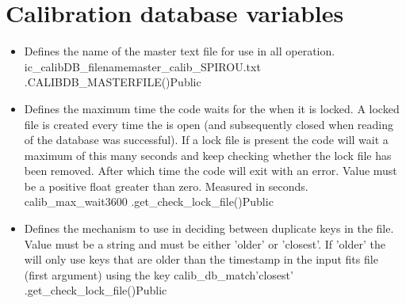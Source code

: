\section{Calibration database variables}
\label{ch:variables:calibdb}

\begin{itemize}

\item {} 
{Defines the name of the master \calibdb text file for use in all \calibdb operation.}
{ic\_calibDB\_filename}{master\_calib{\hskip 0pt}\_SPIROU.txt}
{\AllRecipes}{\constantsfile}{\spirouConst.CALIBDB\_MASTERFILE()}{Public}


\item {}
{Defines the maximum time the code waits for the \calibdb when it is locked. A locked file is created every time the \calibdb is open (and subsequently closed when reading of the database was successful). If a lock file is present the code will wait a maximum of this many seconds and keep checking whether the lock file has been removed. After which time the code will exit with an error. Value must be a positive float greater than zero. Measured in seconds.}
{calib\_max\_wait}{3600}
{\AllRecipes}{\constantsfile}{\spirouCDB.get\_check\_lock\_file()}{Public}


\item {} 
{Defines the mechanism to use in deciding between duplicate keys in the \calibdb file. Value must be a string and must be either 'older' or 'closest'. If 'older' the \calibdb will only use keys that are older than the timestamp in the input fits file (first argument) using the key }
{calib\_db\_match}{'closest'}
{\AllRecipes}{\constantsfile}{\spirouCDB.get\_check\_lock\_file()}{Public}

\end{itemize}








\ifdevguide
\clearpage
\newpage
